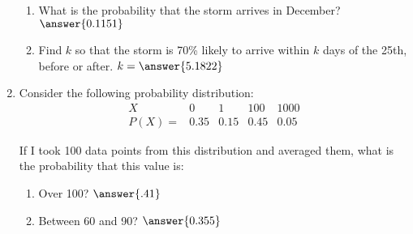 \documentclass{ximera}
\begin{document}
\begin{enumerate}
\begin{enumerate}
\item What is the probability that the storm arrives in December? $\answer{0.1151}$
\item Find $k$ so that the storm is 70\% likely to arrive within $k$ days of the 25th, before or after. $k=\answer{5.1822}$
\end{enumerate}
\item Consider the following probability distribution: $$
\begin{array}{c|cccc}
X & 0 & 1 & 100 & 1000\\
\hline
P(X)= & 0.35 & 0.15 & 0.45 & 0.05
\end{array}
$$

If I took 100 data points from this distribution and averaged them, what is the probability that this value is:
\begin{enumerate}
\item Over 100? $\answer{.41}$
\item Between 60 and 90? $\answer{0.355}$
\end{enumerate}


\end{enumerate}

 
 
      
\end{document}
